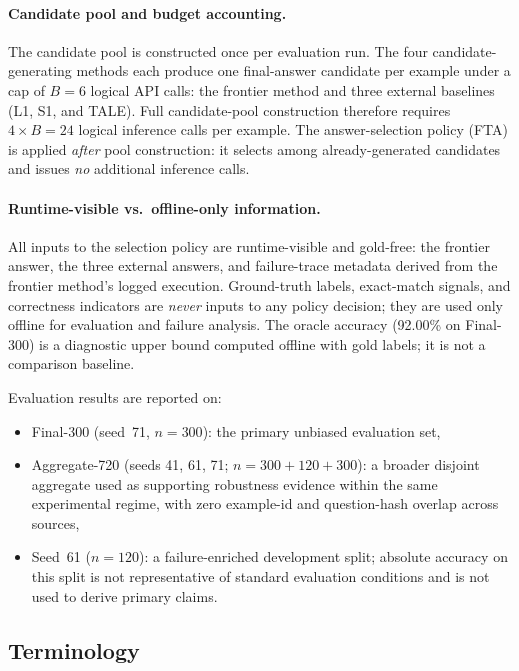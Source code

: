 \documentclass[smallcondensed]{svjour3}
\begin{document}
\paragraph{Candidate pool and budget accounting.}
The candidate pool is constructed once per evaluation run.
The four candidate-generating methods each produce one final-answer candidate per
example under a cap of $B = 6$ logical API calls: the frontier method and three
external baselines (L1, S1, and TALE).
Full candidate-pool construction therefore requires $4 \times B = 24$ logical
inference calls per example.
The answer-selection policy (FTA) is applied \emph{after} pool construction:
it selects among already-generated candidates and issues \emph{no} additional
inference calls.

\paragraph{Runtime-visible vs.\ offline-only information.}
All inputs to the selection policy are runtime-visible and gold-free: the
frontier answer, the three external answers, and failure-trace metadata derived
from the frontier method's logged execution.
Ground-truth labels, exact-match signals, and correctness indicators are
\emph{never} inputs to any policy decision; they are used only offline for
evaluation and failure analysis.
The oracle accuracy (92.00\% on Final-300) is a diagnostic upper bound computed
offline with gold labels; it is not a comparison baseline.

Evaluation results are reported on:
\begin{itemize}[nosep,leftmargin=1.5em]
    \item Final-300 (seed~71, $n=300$): the primary unbiased evaluation set,
    \item Aggregate-720 (seeds 41, 61, 71; $n=300+120+300$): a broader
          disjoint aggregate used as supporting robustness evidence within the
          same experimental regime, with zero example-id and question-hash
          overlap across sources,
    \item Seed~61 ($n=120$): a failure-enriched development split; absolute
          accuracy on this split is not representative of standard evaluation
          conditions and is not used to derive primary claims.
\end{itemize}

\subsection{Terminology}
\label{sec:terminology}
\end{document}
